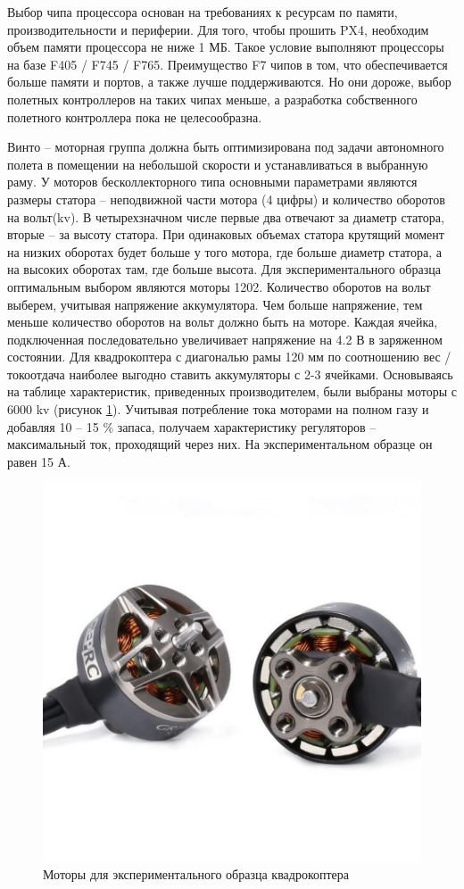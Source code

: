 Выбор чипа процессора основан на требованиях к ресурсам по памяти, производительности и периферии. Для того, чтобы прошить PX4, необходим объем памяти процессора не ниже 1 МБ. Такое условие выполняют процессоры на базе F405 / F745 / F765. Преимущество F7 чипов в том, что обеспечивается больше памяти и портов, а также лучше поддерживаются. Но они дороже, выбор полетных контроллеров на таких чипах меньше, а разработка собственного полетного контроллера пока не целесообразна.

Винто -- моторная группа должна быть оптимизирована под задачи автономного полета в помещении на небольшой скорости и устанавливаться в выбранную раму. У моторов бесколлекторного типа основными параметрами являются размеры статора -- неподвижной части мотора (4 цифры) и количество оборотов на вольт(kv). В четырехзначном числе первые два отвечают за диаметр статора, вторые -- за высоту статора. При одинаковых объемах статора крутящий момент на низких оборотах будет больше у того мотора, где больше диаметр статора, а на высоких оборотах там, где больше высота. Для экспериментального образца оптимальным выбором являются моторы 1202. Количество оборотов на вольт выберем, учитывая напряжение аккумулятора. Чем больше напряжение, тем меньше количество оборотов на вольт должно быть на моторе. Каждая ячейка, подключенная последовательно увеличивает напряжение на 4.2 В в заряженном состоянии. Для квадрокоптера с диагональю рамы 120 мм по соотношению вес / токоотдача наиболее выгодно ставить аккумуляторы с 2-3 ячейками. Основываясь на таблице характеристик, приведенных производителем, были выбраны моторы с 6000 kv (рисунок \ref{fig:motor}).
Учитывая потребление тока моторами на полном газу и добавляя 10 -- 15 \% запаса, получаем характеристику регуляторов -- максимальный ток, проходящий через них. На экспериментальном образце он равен 15 А.
\begin{figure}[H]
	\centering
	\includegraphics[width=0.5\linewidth]{../RW/pics/motor}
	\caption{Моторы для экспериментального образца квадрокоптера
	}
	\label{fig:motor} %
\end{figure}

